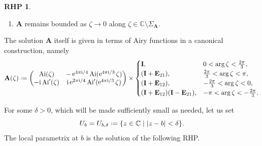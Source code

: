 \documentclass[reqno,a4paper,11pt]{amsart}
\DeclareMathOperator{\ai}{Ai}
\DeclareMathOperator{\ee}{\rm e}
\newcommand{\C}{\mathbb{C}}
\newcommand{\ii}{\mathrm{i}}
\newcommand*{\deff}{\mathrel{\vcenter{\baselineskip0.5ex \lineskiplimit0pt
                     \hbox{\scriptsize.}\hbox{\scriptsize.}}}%
                     =}
\renewcommand{\bm}{\mathbf}
\newcommand{\msf}{\mathsf}
\renewcommand{\sp}{\boldsymbol \sigma}
\theoremstyle{definition}
\newtheorem{rhp}[theorem]{RHP}
\theoremstyle{remark}
\numberwithin{equation}{section}
\newcommand*{\defeq}{\mathrel{\vcenter{\baselineskip0.5ex \lineskiplimit0pt
                     \hbox{\scriptsize.}\hbox{\scriptsize.}}}%
                     =}
\begin{document}
\begin{rhp}
\begin{enumerate}[\rm (i)]
{\[        \]
        }
        \[
        \msf a_k \defeq   \frac{(-1)^{k+1} \Gamma \left( 3 k + \frac{1}{2}\right)}{36^k k! \Gamma\left( k + \frac{1}{2}\right)(6k-1)} ,\quad 
        \bm A_k \deff 
        \msf a_k \times \begin{dcases}
            \left(\bm I + 6k \sp_2\right), \quad &k \text{ even},  \\
            \left(\sp_3 + 6 \ii \sp_1\right), \quad &k \text{ odd}.
        \end{dcases}
        \]
        \item $\bm A$ remains bounded as $\zeta \to 0$ along $\zeta \in \C \setminus \Sigma_{\bm A}$.
    \end{enumerate}
\end{rhp}

The solution $\bm A$ itself is given in terms of Airy functions in a canonical construction, namely
%
$$
\bm A(\zeta)\deff 
\begin{pmatrix}
    \ai(\zeta) & -\ee^{4\pi\ii/4} \ai(\ee^{4\pi \ii/3}\zeta) \\
    -\ii \ai'(\zeta) & \ii \ee^{2\pi\ii/4} \ai'(\ee^{4\pi \ii/3}\zeta)
\end{pmatrix}
\times 
\begin{cases}
    \bm I, & 0<\arg \zeta<\frac{2\pi}{3}, \\ 
    (\bm I+\bm E_{21}), & \frac{2\pi}{3}<\arg \zeta<\pi, \\
    (\bm I+\bm E_{12}), & -\frac{2\pi}{3}<\arg \zeta<0, \\ 
    (\bm I+\bm E_{12})(\bm I-\bm E_{21}), & -\pi<\arg\zeta<-\frac{2\pi}{3}. \\
\end{cases}
$$

    For some $\delta>0$, which will be made sufficiently small as needed, let us set
\[
    U_b = U_{b,\delta} \defeq \{z \in \C \mid |z-b| < \delta \}.
\]
The local parametrix at $b$ is the solution of the following RHP.
\end{document}
